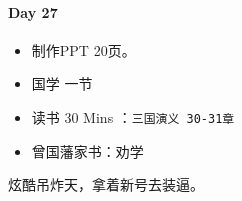 \documentclass[UTF8,a4paper,8pt]{ctexart}
\begin{document}
 	 \paragraph{Day 27      \quad     }
	 	 \begin{itemize}[itemindent = 1em]
	 	 	\renewcommand\labelitemi{\makebox[0pt][l]{$\square$}\raisebox{.15ex}{\hspace{0.1em}$\checkmark$}}		
	 	 	
	 	 	\item    制作PPT 20页。
	 	 	
	 	 	
	 	 	\renewcommand\labelitemi{\makebox[0pt][l]{$\square$}\hspace{1em}}
	 	 	\item   国学  一节
	 	 	\item   读书  30 Mins	：\verb|三国演义 30-31章|
	 	 	\item   曾国藩家书：劝学
	 	 \end{itemize}
	 	 
	 	 炫酷吊炸天，拿着新号去装逼。
\end{document}
